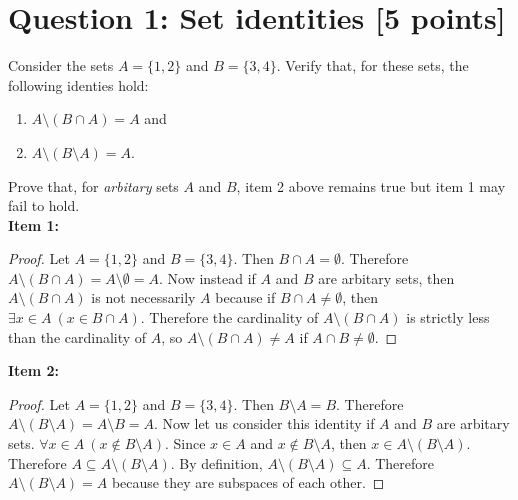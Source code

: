 \documentclass{report}
\theoremstyle{mytheoremstyle}
\theoremstyle{mytheoremstyle}
\theoremstyle{myproblemstyle}
\begin{document}
\section*{\Large{Question 1: Set identities [5 points]}}
Consider the sets $A = \{1, 2\}$ and $B = \{3, 4\}$. Verify that, for these sets, the following identies hold: 
\begin{enumerate}
    \item $A \setminus (B \cap A) = A$ and 
    \item $A \setminus (B \setminus A) = A$.
\end{enumerate} 
Prove that, for \textit{arbitary} sets $A$ and $B$, item 2 above remains true but item 1 may fail to hold.
\\[\baselineskip]
\textbf{Item 1:}
\begin{proof}
Let $A = \{1, 2\}$ and $B = \{3, 4\}$. Then $B \cap A = \emptyset$. Therefore $A \setminus (B \cap A) = A \setminus \emptyset = A$. Now instead if $A$ and $B$ are arbitary sets, then $A \setminus (B \cap A)$ is not necessarily $A$ because if $B \cap A \neq \emptyset$, then $\exists x \in A \: ( x \in B \cap A )$. Therefore the cardinality of $A \setminus (B \cap A)$ is strictly less than the cardinality of $A$, so $A \setminus (B \cap A) \neq A$ if $A \cap B \neq \emptyset$.
\end{proof}
\textbf{Item 2:}
\begin{proof}
Let $A = \{ 1, 2\}$ and $B = \{3, 4\}$. Then $B \setminus A = B$. Therefore $A \setminus (B \setminus A) = A \setminus B = A$. Now let us consider this identity if $A$ and $B$ are arbitary sets. $\forall x \in A \: (x \notin B \setminus A)$. Since $x \in A$ and $x \notin B \setminus A$, then $x \in A \setminus (B \setminus A)$. Therefore $A \subseteq A \setminus (B \setminus A)$. By definition, $A \setminus (B \setminus A) \subseteq A$. Therefore $A \setminus (B \setminus A) = A$ because they are subspaces of each other.\end{proof} 
\newpage
\end{document}
